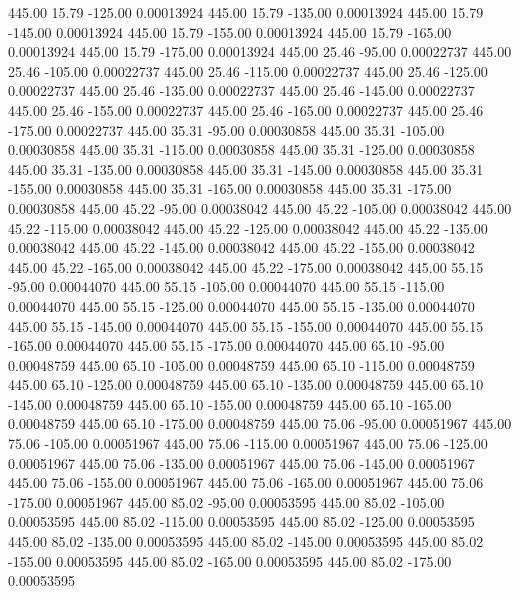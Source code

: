     445.00     15.79   -125.00     0.00013924
    445.00     15.79   -135.00     0.00013924
    445.00     15.79   -145.00     0.00013924
    445.00     15.79   -155.00     0.00013924
    445.00     15.79   -165.00     0.00013924
    445.00     15.79   -175.00     0.00013924
    445.00     25.46    -95.00     0.00022737
    445.00     25.46   -105.00     0.00022737
    445.00     25.46   -115.00     0.00022737
    445.00     25.46   -125.00     0.00022737
    445.00     25.46   -135.00     0.00022737
    445.00     25.46   -145.00     0.00022737
    445.00     25.46   -155.00     0.00022737
    445.00     25.46   -165.00     0.00022737
    445.00     25.46   -175.00     0.00022737
    445.00     35.31    -95.00     0.00030858
    445.00     35.31   -105.00     0.00030858
    445.00     35.31   -115.00     0.00030858
    445.00     35.31   -125.00     0.00030858
    445.00     35.31   -135.00     0.00030858
    445.00     35.31   -145.00     0.00030858
    445.00     35.31   -155.00     0.00030858
    445.00     35.31   -165.00     0.00030858
    445.00     35.31   -175.00     0.00030858
    445.00     45.22    -95.00     0.00038042
    445.00     45.22   -105.00     0.00038042
    445.00     45.22   -115.00     0.00038042
    445.00     45.22   -125.00     0.00038042
    445.00     45.22   -135.00     0.00038042
    445.00     45.22   -145.00     0.00038042
    445.00     45.22   -155.00     0.00038042
    445.00     45.22   -165.00     0.00038042
    445.00     45.22   -175.00     0.00038042
    445.00     55.15    -95.00     0.00044070
    445.00     55.15   -105.00     0.00044070
    445.00     55.15   -115.00     0.00044070
    445.00     55.15   -125.00     0.00044070
    445.00     55.15   -135.00     0.00044070
    445.00     55.15   -145.00     0.00044070
    445.00     55.15   -155.00     0.00044070
    445.00     55.15   -165.00     0.00044070
    445.00     55.15   -175.00     0.00044070
    445.00     65.10    -95.00     0.00048759
    445.00     65.10   -105.00     0.00048759
    445.00     65.10   -115.00     0.00048759
    445.00     65.10   -125.00     0.00048759
    445.00     65.10   -135.00     0.00048759
    445.00     65.10   -145.00     0.00048759
    445.00     65.10   -155.00     0.00048759
    445.00     65.10   -165.00     0.00048759
    445.00     65.10   -175.00     0.00048759
    445.00     75.06    -95.00     0.00051967
    445.00     75.06   -105.00     0.00051967
    445.00     75.06   -115.00     0.00051967
    445.00     75.06   -125.00     0.00051967
    445.00     75.06   -135.00     0.00051967
    445.00     75.06   -145.00     0.00051967
    445.00     75.06   -155.00     0.00051967
    445.00     75.06   -165.00     0.00051967
    445.00     75.06   -175.00     0.00051967
    445.00     85.02    -95.00     0.00053595
    445.00     85.02   -105.00     0.00053595
    445.00     85.02   -115.00     0.00053595
    445.00     85.02   -125.00     0.00053595
    445.00     85.02   -135.00     0.00053595
    445.00     85.02   -145.00     0.00053595
    445.00     85.02   -155.00     0.00053595
    445.00     85.02   -165.00     0.00053595
    445.00     85.02   -175.00     0.00053595
